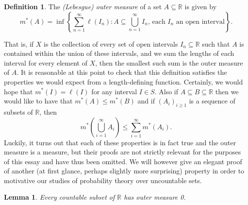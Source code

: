 \documentclass[a4paper,11pt]{article}
\theoremstyle{plain}
\newtheorem{lemma}[theorem]{Lemma}
\theoremstyle{definition}
\newtheorem{definition}[theorem]{Definition}
\begin{document}


\begin{definition}\citep[p.~14]{SA}
The \textit{(Lebesgue) outer measure} of a set $A \subseteq \mathbb{R}$ is given by
\[
m^*(A) = \inf\left\{\sum_{n=1}^{\infty}\ell(I_n): A \subseteq \bigcup_{n=1}^{\infty}I_n \text{, each $I_n$ an open interval}\right\}.
\]
\end{definition}

That is, if $X$ is the collection of every set of open intervals $I_n \subseteq \mathbb{R}$ such that $A$ is contained within the union of these intervals, and we sum the lengths of each interval for every element of $X$, then the smallest such sum is the outer measure of $A$. It is reasonable at this point to check that this definition satisfies the properties we would expect from a length-defining function. Certainly, we would hope that $m^*(I) = \ell(I)$ for any interval $I \in S$. Also if $A \subseteq B \subseteq \mathbb{R}$ then we would like to have that $m^*(A) \leq m^*(B)$ and if $(A_i)_{i \geq 1}$ is a sequence of subsets of $\mathbb{R}$, then
\[
m^*\left(\bigcup_{i=1}^{\infty} A_i\right) \leq \sum_{i=1}^{\infty} m^*(A_i).
\]
Luckily, it turns out that each of these properties is in fact true \citep[pp.~22-25]{MC} and the outer measure is a measure, but their proofs are not strictly relevant for the purposes of this essay and have thus been omitted. We will however give an elegant proof of another (at first glance, perhaps slightly more surprising) property in order to motivative our studies of probability theory over uncountable sets.
\begin{lemma}
Every countable subset of $\mathbb{R}$ has outer measure 0.
\end{lemma}
\end{document}
